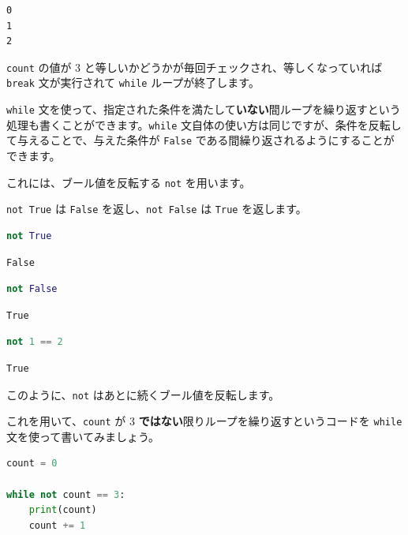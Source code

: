 \begin{lstlisting}[style=outputcell]
0
1
2
\end{lstlisting}

\texttt{count} の値が 3 と等しいかどうかが毎回チェックされ、等しくなっていれば \texttt{break} 文が実行されて \texttt{while} ループが終了します。


\texttt{while} 文を使って、指定された条件を満たして\textbf{いない}間ループを繰り返すという処理も書くことができます。\texttt{while} 文自体の使い方は同じですが、条件を反転して与えることで、与えた条件が \texttt{False} である間繰り返されるようにすることができます。


これには、ブール値を反転する \texttt{not} を用います。

\texttt{not True} は \texttt{False} を返し、\texttt{not False} は \texttt{True} を返します。


\begin{lstlisting}[style=codecell,language=Python]
not True
\end{lstlisting}

\begin{lstlisting}[style=outputcell]
False
\end{lstlisting}

\begin{lstlisting}[style=codecell,language=Python]
not False
\end{lstlisting}

\begin{lstlisting}[style=outputcell]
True
\end{lstlisting}

\begin{lstlisting}[style=codecell,language=Python]
not 1 == 2
\end{lstlisting}

\begin{lstlisting}[style=outputcell]
True
\end{lstlisting}

このように、\texttt{not} はあとに続くブール値を反転します。

これを用いて、\texttt{count} が 3 \textbf{ではない}限りループを繰り返すというコードを \texttt{while} 文を使って書いてみましょう。


\begin{lstlisting}[style=codecell,language=Python]
count = 0

while not count == 3:
    print(count)
    count += 1
\end{lstlisting}

